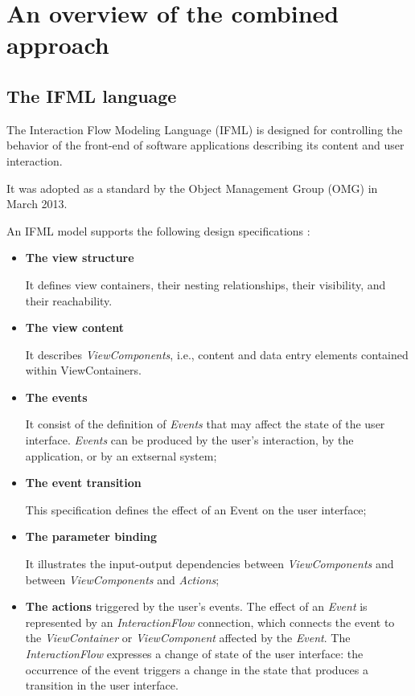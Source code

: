\chead{}
\chapter{An overview of the combined approach}

\section{The IFML language}

The Interaction Flow Modeling Language (IFML)\cite{IFML-1,IFML-2} is designed for controlling the behavior of the front-end of software applications describing its content and user interaction. 

It was adopted as a standard by the Object Management Group (OMG) in March 2013.

An IFML model supports the following design specifications : 

\begin{itemize}
  \item \textbf{The view structure} 

  It defines view containers, their nesting relationships, their visibility, and their reachability.
  
  \item \textbf{The view content} 
  
  It describes \textit{ViewComponents}, i.e., content and data entry elements contained within ViewContainers.
  
  \item \textbf{The events} 

  It consist of the definition of \textit{Events} that may affect the state of the user interface. \textit{Events} can be produced by the user’s interaction, by the application, or by an extsernal system; 

  \item \textbf{The event transition} 
  
  This specification defines the effect of an Event on the user interface; 

  \item \textbf{The parameter binding} 
  
  It illustrates the input-output dependencies between \textit{ViewComponents} and between \textit{ViewComponents} and \textit{Actions}; 

  \item \textbf{The actions} triggered by the user’s events. The effect of an \textit{Event} is represented by an \textit{InteractionFlow} connection, which connects the event to the \textit{ViewContainer} or \textit{ViewComponent} affected by the \textit{Event}. The \textit{InteractionFlow} expresses a change of state of the user interface: the occurrence of the event triggers a change in the state that produces a transition in the user interface.

\end{itemize} 

